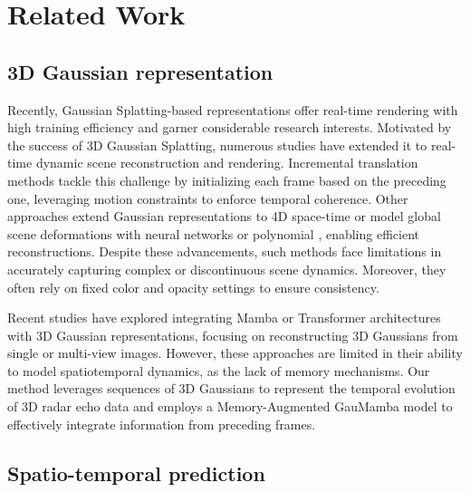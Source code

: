 \section{Related Work}
\subsection{3D Gaussian representation}

Recently, Gaussian Splatting-based representations offer real-time rendering with high training efficiency and garner considerable research interests\cite{tang2023dreamgaussian, diolatzis2024nd-gaussian, mallick2024taming, zhou2024feature3dgs}. Motivated by the success of 3D Gaussian Splatting, numerous studies have extended it to real-time dynamic scene reconstruction and rendering.
%
Incremental translation methods \cite{dyn-3dgs, 3dgstream} tackle this challenge by initializing each frame based on the preceding one, leveraging motion constraints to enforce temporal coherence. Other approaches extend Gaussian representations to 4D space-time \cite{4d-gaussian} or model global scene deformations with neural networks or polynomial \cite{4dgs, deformable_gaussian, spacetime-gaussian}, enabling efficient reconstructions. Despite these advancements, such methods face limitations in accurately capturing complex or discontinuous scene dynamics. Moreover, they often rely on fixed color and opacity settings to ensure consistency.

\textcolor{edit}{
Recent studies \cite{shen2024gamba, yi2024mvgamba, ziwen2024long, zhang2025gslrm} have explored integrating Mamba \cite{mamba, mamba2} or Transformer architectures with 3D Gaussian representations, focusing on reconstructing 3D Gaussians from single or multi-view images. However, these approaches are limited in their ability to model spatiotemporal dynamics, as the lack of memory mechanisms. Our method leverages sequences of 3D Gaussians to represent the temporal evolution of 3D radar echo data and employs a Memory-Augmented GauMamba model to effectively integrate information from preceding frames. 
}

\subsection{Spatio-temporal prediction}

